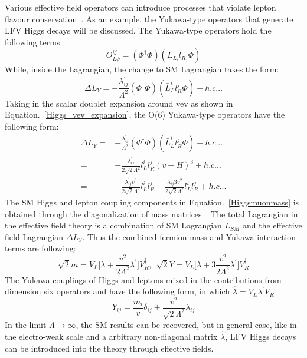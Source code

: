 Various effective field operators can introduce processes that violate lepton flavour conservation~\cite{PhysRevD.62.116005}. As an example, the Yukawa-type operators that generate LFV Higgs decays will be discussed. The Yukawa-type operators hold the following terms:
\begin{equation}
O^{ij}_{L\phi}=(\Phi^{\dagger}\Phi)(\bar{L}_{L_{i}}l_{R_{j}}\Phi)
\end{equation}
While, inside the Lagrangian, the change to SM Lagrangian takes the form:
\begin{equation}
\Delta L_{Y}=-\frac{\lambda^{'}_{ij}}{\Lambda^{2}}(\Phi^{\dagger}\Phi)(\bar{L}^{i}_{L}l^{j}_{R}\Phi)+h.c...
\end{equation}
Taking in the scalar doublet expansion around vev as shown in Equation.~\ref{Higgs_vev_expansion}, the O(6) Yukawa-type operators have the following form:
\begin{equation}
\begin{aligned}
\Delta L_{Y}=&-\frac{\lambda^{'}_{ij}}{\Lambda^{2}}(\Phi^{\dagger}\Phi)(\bar{L}^{i}_{L}l^{j}_{R}\Phi)+h.c...\\
         =&-\frac{\lambda^{'}_{ij}}{2\sqrt{2}\Lambda^{2}}l_{L}^{i}l_{R}^{j}(v+H)^{3}+h.c...\\
         =&-\frac{\lambda^{'}_{ij}v^{3}}{2\sqrt{2}\Lambda^{2}}l_{L}^{i}l_{R}^{j}-\frac{\lambda^{'}_{ij}3v^{2}}{2\sqrt{2}\Lambda^{2}}l_{L}^{i}l_{R}^{j}+h.c...
\end{aligned}
\end{equation}
The SM Higgs and lepton coupling components in Equation.~\ref{Higgsmuonmass} is obtained through the diagonalization of mass matrices~\cite{Harnik:2012pb}. The total Lagrangian in the effective field theory is a combination of SM Lagrangian $L_{SM}$ and the effective field Lagrangian $\Delta L_{Y}$. Thus the combined fermion mass and Yukawa interaction terms are following:
\begin{equation}
\sqrt{2}m=V_{L}\Big[\lambda+\frac{v^{2}}{2\Lambda^{2}}\lambda^{'}\Big]V^{\dagger}_{R},~~\sqrt{2}Y=V_{L}\Big[\lambda+3\frac{v^{2}}{2\Lambda^{2}}\lambda^{'}\Big]V^{\dagger}_{R}
\end{equation}
The Yukawa couplings of Higgs and leptons mixed in the contributions from dimension six operators and have the following form, in which $\hat{\lambda}=V_{L}\lambda^{'}V_{R}$
\begin{equation}
Y_{ij}=\frac{m_{i}}{v}\delta_{ij}+\frac{v^{2}}{\sqrt{2}\Lambda^{2}}\hat{\lambda}_{ij}
\end{equation}
In the limit $\Lambda \to \infty$, the SM results can be recovered, but in general case, like in the electro-weak scale and a arbitrary non-diagonal matrix $\hat{\lambda}$, LFV Higgs decays can be introduced into the theory through effective fields.




